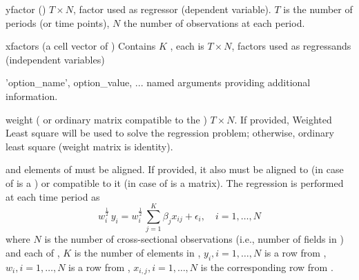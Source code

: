 \inarg
   \begin{argdesc}
   \item[yfactor]   (\myfints{}) $T\times N$, factor used as regressor (dependent variable). 
                    $T$ is the number of periods (or time points), 
                    $N$ the number of observations at each period.
   \item[xfactors]  (a cell vector of \myfints{}) Contains $K$ \myfints{},
                    each is $T\times N$, 
                    factors used as regressands (independent variables)
   \item['option\_name', option\_value, ...] named arguments providing additional information.
        \begin{argdesc}
        \item[weight] (\myfints{} or ordinary matrix compatible to the ) 
                      $T\times N$. 
                      If provided, Weighted Least square will be used to solve the regression problem;
                      otherwise, ordinary least square (weight matrix is identity).
        \end{argdesc}
   \end{argdesc}

   and elements of  must be aligned. 
  If  provided, it also must be aligned to  
  (in case of  is a \myfints{}) or compatible to it 
  (in case of  is a matrix).
  The regression is performed at each time period as
  \[
      w_i^{\frac{1}{2}}\,y_i = w_i^{\frac{1}{2}}\,\sum_{j=1}^{K} \beta_{j}x_{ij} + \epsilon_i, \quad i=1,\ldots,N
  \]
  where $N$ is the number of cross-sectional observations (i.e., number of fields in )
  and each of , $K$ is the number of elements in ,
  $y_i, i=1,\ldots,N$ is a row from , 
  $w_i, i=1,\ldots,N$ is a row from , 
  $x_{i,j}, i=1,\ldots,N$ is the corresponding row from .

